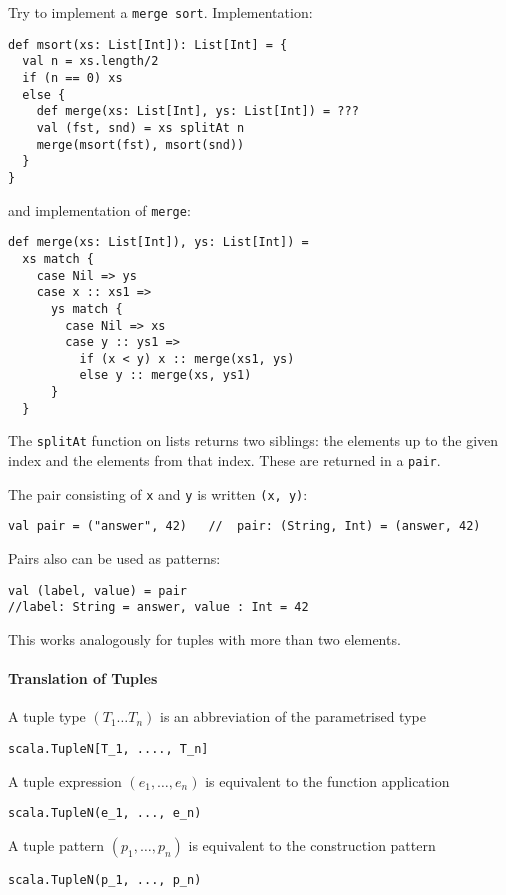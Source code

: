 \documentclass{scrartcl}
\newcommand{\term}[1]{\verb~#1~} %
\begin{document}
Try to implement a \term{merge sort}. Implementation:
\begin{lstlisting}
def msort(xs: List[Int]): List[Int] = {
  val n = xs.length/2
  if (n == 0) xs
  else {
    def merge(xs: List[Int], ys: List[Int]) = ???
    val (fst, snd) = xs splitAt n
    merge(msort(fst), msort(snd))
  }
}
\end{lstlisting}
and implementation of \lstinline|merge|:
\begin{lstlisting}
def merge(xs: List[Int]), ys: List[Int]) = 
  xs match {
    case Nil => ys
    case x :: xs1 => 
      ys match {
        case Nil => xs
        case y :: ys1 =>
          if (x < y) x :: merge(xs1, ys)
          else y :: merge(xs, ys1)
      }
  }
\end{lstlisting}
The \lstinline|splitAt| function on lists returns two siblings: the elements up
to the given index and the elements from that index. These are returned in a
\term{pair}.

The pair consisting of \lstinline|x| and \lstinline|y| is written
\lstinline|(x, y)|:
\begin{lstlisting}
val pair = ("answer", 42)   //  pair: (String, Int) = (answer, 42)
\end{lstlisting}

Pairs also can be used as patterns:
\begin{lstlisting}
val (label, value) = pair 
//label: String = answer, value : Int = 42
\end{lstlisting}

This works analogously for tuples with more than two elements.

\paragraph{Translation of Tuples}

A tuple type $(T_1 \dots T_n)$ is an abbreviation of the parametrised type
\begin{lstlisting}
scala.TupleN[T_1, ...., T_n]
\end{lstlisting}

A tuple expression $(e_1, \dots, e_n)$ is equivalent to the function application
\begin{lstlisting}
scala.TupleN(e_1, ..., e_n)
\end{lstlisting}
A tuple pattern $(p_1, \dots,p_n)$ is equivalent to the construction pattern
\begin{lstlisting}
scala.TupleN(p_1, ..., p_n)
\end{lstlisting}
\end{document}

